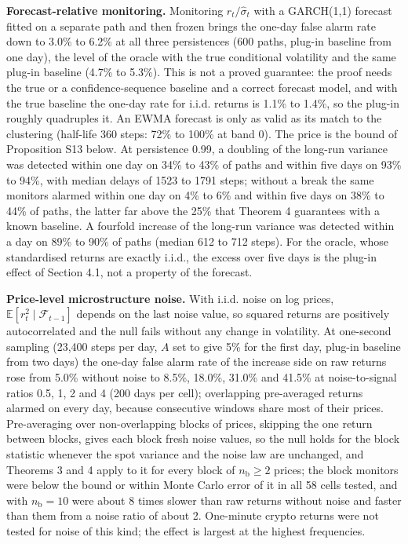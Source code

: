 \documentclass[
]{article}
\begin{document}
\textbf{Forecast-relative monitoring.} Monitoring \(r_t/\hat\sigma_t\)
with a GARCH(1,1) forecast fitted on a separate path and then frozen
brings the one-day false alarm rate down to 3.0\% to 6.2\% at all three
persistences (600 paths, plug-in baseline from one day), the level of
the oracle with the true conditional volatility and the same plug-in
baseline (4.7\% to 5.3\%). This is not a proved guarantee: the proof
needs the true or a confidence-sequence baseline and a correct forecast
model, and with the true baseline the one-day rate for i.i.d. returns is
1.1\% to 1.4\%, so the plug-in roughly quadruples it. An EWMA forecast
is only as valid as its match to the clustering (half-life 360 steps:
72\% to 100\% at band 0). The price is the bound of Proposition S13
below. At persistence 0.99, a doubling of the long-run variance was
detected within one day on 34\% to 43\% of paths and within five days on
93\% to 94\%, with median delays of 1523 to 1791 steps; without a break
the same monitors alarmed within one day on 4\% to 6\% and within five
days on 38\% to 44\% of paths, the latter far above the 25\% that
Theorem 4 guarantees with a known baseline. A fourfold increase of the
long-run variance was detected within a day on 89\% to 90\% of paths
(median 612 to 712 steps). For the oracle, whose standardised returns
are exactly i.i.d., the excess over five days is the plug-in effect of
Section 4.1, not a property of the forecast.

\textbf{Price-level microstructure noise.} With i.i.d. noise on log
prices, \(\mathbb{E}[r_t^2 \mid \mathcal{F}_{t-1}]\) depends on the last
noise value, so squared returns are positively autocorrelated and the
null fails without any change in volatility. At one-second sampling
(23,400 steps per day, \(A\) set to give 5\% for the first day, plug-in
baseline from two days) the one-day false alarm rate of the increase
side on raw returns rose from 5.0\% without noise to 8.5\%, 18.0\%,
31.0\% and 41.5\% at noise-to-signal ratios 0.5, 1, 2 and 4 (200 days
per cell); overlapping pre-averaged returns alarmed on every day,
because consecutive windows share most of their prices. Pre-averaging
over non-overlapping blocks of prices, skipping the one return between
blocks, gives each block fresh noise values, so the null holds for the
block statistic whenever the spot variance and the noise law are
unchanged, and Theorems 3 and 4 apply to it for every block of
\(n_{\mathrm{b}} \ge 2\) prices; the block monitors were below the bound
or within Monte Carlo error of it in all 58 cells tested, and with
\(n_{\mathrm{b}} = 10\) were about 8 times slower than raw returns
without noise and faster than them from a noise ratio of about 2.
One-minute crypto returns were not tested for noise of this kind; the
effect is largest at the highest frequencies.
\end{document}
